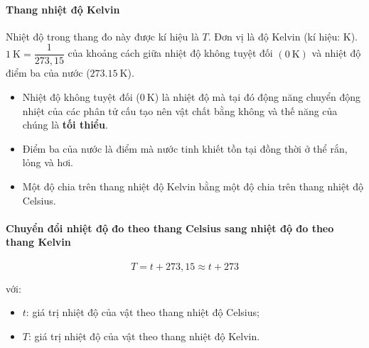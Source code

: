 \begin{tomtat}
\paragraph{Thang nhiệt độ Kelvin}
\begin{boxdn}
	Nhiệt độ trong thang đo này được kí hiệu là $T$. Đơn vị là độ Kelvin (kí hiệu: $\si{\kelvin}$).\\
	$\SI{1}{\kelvin}=\dfrac{1}{273,15}$ của khoảng cách giữa nhiệt độ không tuyệt đối $\left(\SI{0}{\kelvin}\right)$ và nhiệt độ điểm ba của nước ($\SI{273.15}{\kelvin}$).
\end{boxdn}
\begin{luuy}
	\begin{itemize}
		\item Nhiệt độ không tuyệt đối ($\SI{0}{\kelvin}$) là nhiệt độ mà tại đó động năng chuyển động nhiệt của các phân tử cấu tạo nên vật chất bằng không và thế năng của chúng là \textbf{tối thiểu}.
		\item Điểm ba của nước là điểm mà nước tinh khiết tồn tại đồng thời ở thể rắn, lỏng và hơi.
		\item Một độ chia trên thang nhiệt độ Kelvin bằng một độ chia trên thang nhiệt độ Celsius.
	\end{itemize}
\end{luuy}
\paragraph{Chuyển đổi nhiệt độ đo theo thang Celsius sang nhiệt độ đo theo thang Kelvin}
\begin{boxdl}
	\begin{equation}
		T=t+273,15\approx t+273
	\end{equation}
\end{boxdl}
với:
\begin{itemize}
	\item $t$: giá trị nhiệt độ của vật theo thang nhiệt độ Celsius;
	\item $T$: giá trị nhiệt độ của vật theo thang nhiệt độ Kelvin.
\end{itemize}
\end{tomtat}

